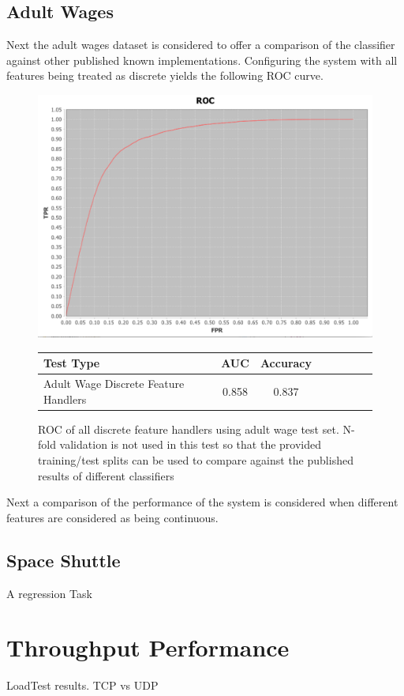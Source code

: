 \documentclass[a4paper,11pt]{scrreprt}
\begin{document}
\subsection{Adult Wages}
Next the adult wages dataset is considered to offer a comparison of the classifier against other published known implementations. Configuring the system with all features being treated as discrete yields the following ROC curve.
\begin{figure}[h!]
\centering
\caption{ROC of all discrete feature handlers using adult wage test set. N-fold validation is not used in this test so that the provided training/test splits can be used to compare against the published results of different classifiers}
\includegraphics[scale=0.45, trim=0 5 0 0, clip=true] {all_discrete_features_adult_earnings.png}
\label{fig:indexes}
\begin{tabular}{l*{6}{c}r}
Test Type & AUC & Accuracy \\
\hline
Adult Wage Discrete Feature Handlers & 0.858 & 0.837 \\
\end{tabular}
\end{figure}
Next a comparison of the performance of the system is considered when different features are considered as being continuous.
\subsection{Space Shuttle}
A regression Task
\section{Throughput Performance}
LoadTest results. TCP vs UDP
\end{document}
